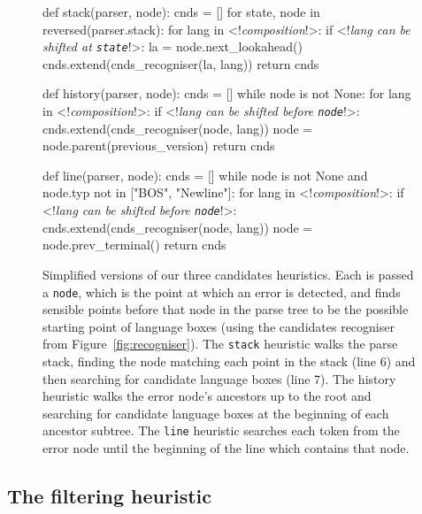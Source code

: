 \documentclass[sigplan,screen]{acmart}\settopmatter{printfolios=true,printccs=false,printacmref=false}
\begin{document}
\begin{figure}[t]
\begin{minipage}[t]{0.55\textwidth}
\begin{lstdefault}[]
def stack(parser, node):
  cnds = []
  for state, node in reversed(parser.stack):
    for lang in <!\textrm{\textit{composition}}!>:
      if <!\textrm{\textit{lang can be shifted at \texttt{state}}}!>:
        la = node.next_lookahead()
        cnds.extend(cnds_recogniser(la, lang))
  return cnds

def history(parser, node):
  cnds = []
  while node is not None:
    for lang in <!\textrm{\textit{composition}}!>:
      if <!\textrm{\textit{lang can be shifted before \texttt{node}}}!>:
        cnds.extend(cnds_recogniser(node, lang))
    node = node.parent(previous_version)
  return cnds

def line(parser, node):
  cnds = []
  while node is not None and node.typ not in ["BOS", "Newline"]:
    for lang in <!\textrm{\textit{composition}}!>:
      if <!\textrm{\textit{lang can be shifted before \texttt{node}}}!>:
        cnds.extend(cnds_recogniser(node, lang))
    node = node.prev_terminal()
  return cnds
\end{lstdefault}
\end{minipage}
\begin{minipage}[t]{0.44\textwidth}
  \caption{Simplified versions of our three candidates heuristics. Each is
  passed a \texttt{node}, which is the point at which an error is detected, and
finds sensible points before that node in the parse tree to be the possible
starting point of language boxes (using the candidates recogniser from
Figure~\ref{fig:recogniser}). The \texttt{stack} heuristic walks the parse
stack, finding the node matching each point in the stack (line 6) and then
searching for candidate language boxes (line 7). The history heuristic
walks the error node's ancestors up to the root and searching for candidate
language boxes at the beginning of each ancestor subtree. The \texttt{line}
heuristic
searches each token from the error node until the beginning of the line which
contains that node.}
\end{minipage}
\label{lst_find_candidates}
\end{figure}


\subsection{The filtering heuristic}
\label{sec:filtering}
\end{document}
